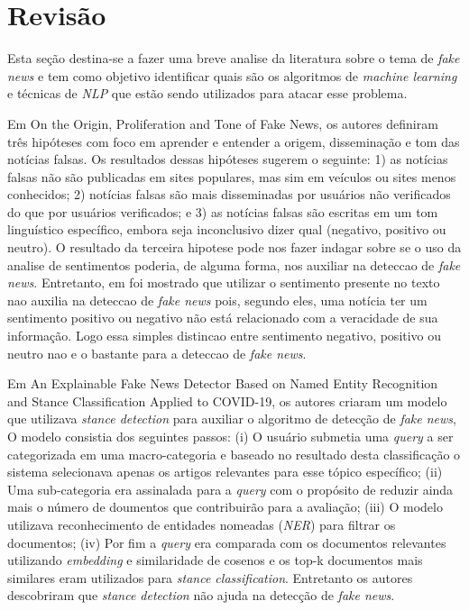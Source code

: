 \section{Revisão}



Esta seção destina-se a fazer uma breve analise da literatura sobre o tema de \textit{fake news} e tem como objetivo identificar quais são os algoritmos de \textit{machine learning} e técnicas de \textit{NLP} que estão sendo utilizados para atacar esse problema.

Em \cite {} On the Origin, Proliferation and Tone of Fake News, os autores definiram três hipóteses com foco em aprender e entender a origem, disseminação e tom das notícias falsas. Os resultados dessas hipóteses sugerem o seguinte: 1) as notícias falsas não são publicadas em sites populares, mas sim em veículos ou sites menos conhecidos; 2) notícias falsas são mais disseminadas por usuários não verificados do que por usuários verificados; e 3) as notícias falsas são escritas em um tom linguístico específico, embora seja inconclusivo dizer qual (negativo, positivo ou neutro). O resultado da terceira hipotese pode nos fazer indagar sobre se o uso da analise de sentimentos poderia, de alguma forma, nos auxiliar na deteccao de \textit{fake news}. Entretanto, em \citet{baarir2020} foi mostrado que utilizar o sentimento presente no texto nao auxilia na deteccao de \textit{fake news} pois, segundo eles, uma notícia ter um sentimento positivo ou negativo não está relacionado com a veracidade de sua informação. Logo essa simples distincao entre sentimento negativo, positivo ou neutro nao e o bastante para a deteccao de \textit{fake news}.


Em \cite{} An Explainable Fake News Detector Based on Named Entity Recognition and Stance Classification Applied to COVID-19, os autores criaram um modelo que utilizava \textit{stance detection} para auxiliar o algoritmo de detecção de \textit{fake news}, O modelo consistia dos seguintes passos: (i) O usuário submetia uma \textit{query} a ser categorizada em uma macro-categoria e baseado no resultado desta classificação o sistema selecionava apenas os artigos relevantes para esse tópico específico; (ii) Uma sub-categoria era assinalada para a \textit{query} com o propósito de reduzir ainda mais o número de doumentos que contribuirão para a avaliação; (iii) O modelo utilizava reconhecimento de entidades nomeadas (\textit{NER}) para filtrar os documentos; (iv) Por fim a \textit{query} era comparada com os documentos relevantes utilizando \textit{embedding} e similaridade de cosenos e os top-k documentos mais similares eram utilizados para \textit{stance classification}. Entretanto os autores descobriram que \textit{stance detection} não ajuda na detecção de \textit{fake news}.


